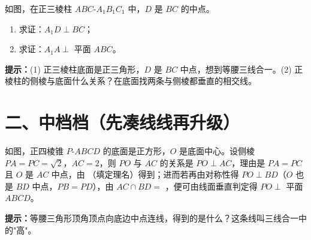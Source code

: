 \documentclass{exam-zh}
\begin{document}

\begin{problem}[points=8]
  \noindent
  \begin{minipage}[t]{\dimexpr\linewidth-60mm-6mm\relax}
    \vspace{0pt}
    如图，在正三棱柱 $ABC\text{-}A_1B_1C_1$ 中，$D$ 是 $BC$ 的中点。
\begin{enumerate}[label=(\\ arabic*)]
  \item 求证：$A_1D\perp BC$；
  \item 求证：$A_1A\perp$ 平面 $ABC$。
\ \end{enumerate}

    \begin{hintbox}
\textbf{提示：}(1) 正三棱柱底面是正三角形，$D$ 是 $BC$ 中点，想到等腰三线合一。(2) 正棱柱的侧棱与底面什么关系？在底面找两条与侧棱都垂直的相交线。\end{hintbox}

  \end{minipage}\hfill
  \begin{diagramcoltikz}{60mm}{正三棱柱，D 为 BC 中点，观察 A1D 与 BC、侧棱与底面。}
  }
  \end{diagramcoltikz}
  \par\medskip
  \answerarea[48mm]
\end{problem}


\section*{二、中档档（先凑线线再升级）}


\begin{question}[points=5]
  \noindent
  \begin{minipage}[t]{\dimexpr\linewidth-60mm-6mm\relax}
    \vspace{0pt}
    如图，正四棱锥 $P\text{-}ABCD$ 的底面是正方形，$O$ 是底面中心。设侧棱 $PA=PC=\sqrt{2}$，$AC=2$，则 $PO$ 与 $AC$ 的关系是 $PO\perp AC$，理由是 $PA=PC$ 且 $O$ 是 $AC$ 中点，由 \underline{\quad\quad\quad\quad\quad\quad}（填定理名）得到；进而若再由对称性得 $PO\perp BD$（$O$ 也是 $BD$ 中点，$PB=PD$），由 $AC\cap BD=$ \underline{\quad}，便可由线面垂直判定得 $PO\perp$ 平面 $ABCD$。
    \begin{hintbox}
\textbf{提示：}等腰三角形顶角顶点向底边中点连线，得到的是什么？这条线叫三线合一中的"高"。\end{hintbox}

  \end{minipage}\hfill
  \begin{diagramcoltikz}{60mm}{正四棱锥，O 为底面中心，观察 PO 与两条对角线的关系。}
  }
  \end{diagramcoltikz}
\end{question}
\end{document}
